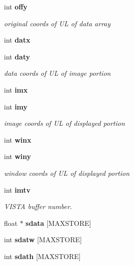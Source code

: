 \begin{CompactItemize}
\item 
int {\bf offy}\label{xtvutils_8c_a88}

\begin{CompactList}\small\item\em original coords of UL of data array \item\end{CompactList}\item 
int {\bf datx}\label{xtvutils_8c_a89}

\item 
int {\bf daty}\label{xtvutils_8c_a90}

\begin{CompactList}\small\item\em data coords of UL of image portion \item\end{CompactList}\item 
int {\bf imx}\label{xtvutils_8c_a91}

\item 
int {\bf imy}\label{xtvutils_8c_a92}

\begin{CompactList}\small\item\em image coords of UL of displayed portion \item\end{CompactList}\item 
int {\bf winx}\label{xtvutils_8c_a93}

\item 
int {\bf winy}\label{xtvutils_8c_a94}

\begin{CompactList}\small\item\em window coords of UL of displayed portion \item\end{CompactList}\item 
int {\bf imtv}\label{xtvutils_8c_a95}

\begin{CompactList}\small\item\em VISTA buffer number. \item\end{CompactList}\item 
float $\ast$ {\bf sdata} [MAXSTORE]\label{xtvutils_8c_a96}

\item 
int {\bf sdatw} [MAXSTORE]\label{xtvutils_8c_a97}

\item 
int {\bf sdath} [MAXSTORE]\label{xtvutils_8c_a98}


\end{CompactItemize}
